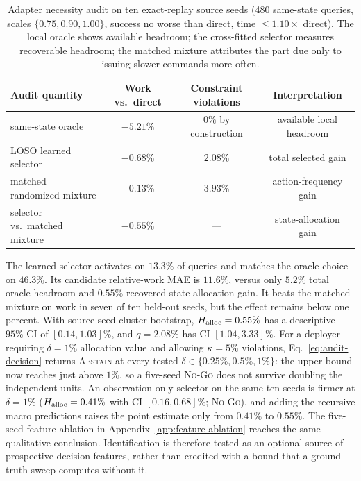 \documentclass{article}
\begin{document}
\begin{table}[t]
\centering
\caption{Adapter necessity audit on ten exact-replay source seeds (480 same-state queries, scales $\{0.75,0.90,1.00\}$, success no worse than direct, time $\le1.10\times$ direct). The local oracle shows available headroom; the cross-fitted selector measures recoverable headroom; the matched mixture attributes the part due only to issuing slower commands more often.}
\label{tab:adapter-audit}
\begin{tabular}{lccc}
\toprule
Audit quantity & Work vs.\ direct & Constraint violations & Interpretation \\
\midrule
same-state oracle & $-5.21\%$ & $0\%$ by construction & available local headroom \\
LOSO learned selector & $-0.68\%$ & $2.08\%$ & total selected gain \\
matched randomized mixture & $-0.13\%$ & $3.93\%$ & action-frequency gain \\
selector vs.\ matched mixture & $-0.55\%$ & --- & state-allocation gain \\
\bottomrule
\end{tabular}
\end{table}

The learned selector activates on $13.3\%$ of queries and matches the oracle
choice on $46.3\%$. Its candidate relative-work MAE is $11.6\%$, versus only
$5.2\%$ total oracle headroom and $0.55\%$ recovered state-allocation gain.
It beats the matched mixture on work in seven of ten held-out seeds, but the
effect remains below one percent. With source-seed cluster bootstrap,
$H_{\rm alloc}=0.55\%$ has a descriptive $95\%$ CI of $[0.14,1.03]\%$, and
$q=2.08\%$ has CI $[1.04,3.33]\%$. For a deployer requiring $\delta=1\%$
allocation value and allowing $\kappa=5\%$ violations, Eq.~\ref{eq:audit-decision}
returns \textsc{Abstain} at every tested $\delta\in\{0.25\%,0.5\%,1\%\}$: the
upper bound now reaches just above $1\%$, so a five-seed \textsc{No-Go} does not
survive doubling the independent units. An observation-only selector on the same
ten seeds is firmer at $\delta=1\%$ ($H_{\rm alloc}=0.41\%$ with CI
$[0.16,0.68]\%$; \textsc{No-Go}), and adding the recursive macro predictions
raises the point estimate only from $0.41\%$ to $0.55\%$. The five-seed feature
ablation in Appendix~\ref{app:feature-ablation} reaches the same qualitative
conclusion. Identification is therefore tested as an optional source of
prospective decision features, rather than credited with a bound that a
ground-truth sweep computes without it.
\end{document}
